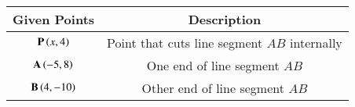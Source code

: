 \begin{tabular}[12pt]{ |c| c|}
    \hline
    \textbf{Given Points} & \textbf{Description}\\ 
    \hline
    $\mathbf{P}\left(x,4\right)$ & Point that cuts line segment $AB$ internally \\
    \hline 
    $\mathbf{A}\left(-5,8\right)$ & One end of line segment $AB$\\
    \hline
    $\mathbf{B}\left(4,-10\right)$ & Other end of line segment $AB$\\
    \hline   
    \end{tabular}
